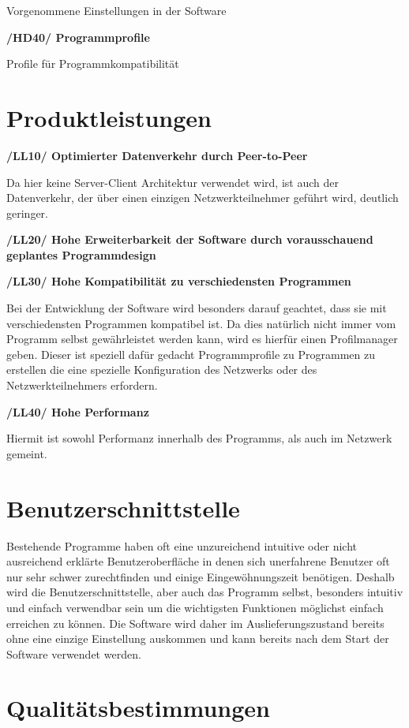 \documentclass[a4paper,12pt]{scrreprt}
\begin{document}
	Vorgenommene Einstellungen in der Software
	
	\textbf{/HD40/ Programmprofile}
	
	Profile für Programmkompatibilität

\chapter{Produktleistungen}
\textbf{/LL10/ Optimierter Datenverkehr durch Peer-to-Peer}
	
	Da hier keine Server-Client Architektur verwendet wird, ist auch der Datenverkehr, der über einen einzigen Netzwerkteilnehmer geführt wird, deutlich geringer.
	
\textbf{/LL20/ Hohe Erweiterbarkeit der Software durch vorausschauend geplantes Programmdesign}
	
\textbf{/LL30/ Hohe Kompatibilität zu verschiedensten Programmen}
	
	Bei der Entwicklung der Software wird besonders darauf geachtet, dass sie mit verschiedensten Programmen kompatibel ist. Da dies natürlich nicht immer vom Programm selbst gewährleistet werden kann, wird es hierfür einen Profilmanager geben. Dieser ist speziell dafür gedacht Programmprofile zu Programmen zu erstellen die eine spezielle Konfiguration des Netzwerks oder des Netzwerkteilnehmers erfordern.
	
\textbf{/LL40/ Hohe Performanz}
	
	Hiermit ist sowohl Performanz innerhalb des Programms, als auch im Netzwerk gemeint.
	
	
	
	
\chapter{Benutzerschnittstelle}
	Bestehende Programme haben oft eine unzureichend intuitive oder nicht ausreichend erklärte Benutzeroberfläche in denen sich unerfahrene Benutzer oft nur sehr schwer zurechtfinden und einige Eingewöhnungszeit benötigen. Deshalb wird die Benutzerschnittstelle, aber auch das Programm selbst, besonders intuitiv und einfach verwendbar sein um die wichtigsten Funktionen möglichst einfach erreichen zu können. Die Software wird daher im Auslieferungszustand bereits ohne eine einzige Einstellung auskommen und kann bereits nach dem Start der Software verwendet werden.
	
	
	
\chapter{Qualitätsbestimmungen}
	
\end{document}

